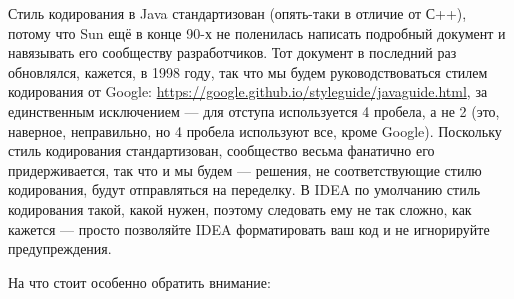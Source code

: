 \documentclass[a5paper]{article}
\begin{document}
Стиль кодирования в Java стандартизован (опять-таки в отличие от С++), потому что Sun ещё в конце 90-х не поленилась написать подробный документ и навязывать его сообществу разработчиков. Тот документ в последний раз обновлялся, кажется, в 1998 году, так что мы будем руководствоваться стилем кодирования от Google: \url{https://google.github.io/styleguide/javaguide.html}, за единственным исключением --- для отступа используется 4 пробела, а не 2 (это, наверное, неправильно, но 4 пробела используют все, кроме Google). Поскольку стиль кодирования стандартизован, сообщество весьма фанатично его придерживается, так что и мы будем --- решения, не соответствующие стилю кодирования, будут отправляться на переделку. В IDEA по умолчанию стиль кодирования такой, какой нужен, поэтому следовать ему не так сложно, как кажется --- просто позволяйте IDEA форматировать ваш код и не игнорируйте предупреждения.

На что стоит особенно обратить внимание:
\end{document}
